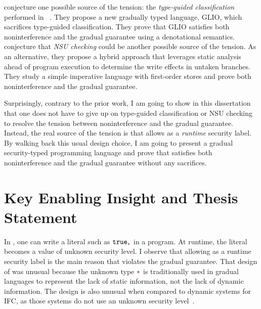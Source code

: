 \textcite{Amorim:2020aa} conjecture one possible source of the tension: the
\textit{type-guided classification} performed in
\GSLRef~\parencite{Toro:2018aa}. They propose a new gradually typed language,
GLIO, which sacrifices type-guided classification. They prove that GLIO
satisfies both noninterference and the gradual guarantee using a denotational
semantics.
%
\textcite{bichhawat2021gradual} conjecture that \textit{NSU checking} could be
another possible source of the tension. As an alternative, they propose a hybrid
approach that leverages static analysis ahead of program execution to determine
the write effects in untaken branches. They study a simple imperative language
with first-order stores and prove both noninterference and the gradual
guarantee.

Surprisingly, contrary to the prior work, I am going to show in this
dissertation that one does not have to give up on type-guided classification or
NSU checking to resolve the tension between noninterference and the gradual
guarantee. Instead, the real source of the tension is that \GSLRef allows \unk
as a \textit{runtime} security label. By walking back this usual design choice,
I am going to present a gradual security-typed programming language \Surface and
prove that \Surface satisfies both noninterference and the gradual guarantee
without any sacrifices.

\section{Key Enabling Insight and Thesis Statement}

In \GSLRef{}, one can write a literal such as $\true_{\unk}$ in a program. At
runtime, the literal becomes a value of unknown security level. I observe that
allowing \unk as a runtime security label is the main reason that \GSLRef
violates the gradual guarantee. That design of \GSLRef was unusual because the
unknown type $\unk$ is traditionally used in gradual languages to represent the
lack of static information, not the lack of dynamic information. The design is
also unusual when compared to dynamic systems for IFC, as those systems do not
use an unknown security
level~\parencite{Askarov:2009vq,austin2009efficient,Devriese:2010up,stefan2011flexible,Austin:2017uh}.

